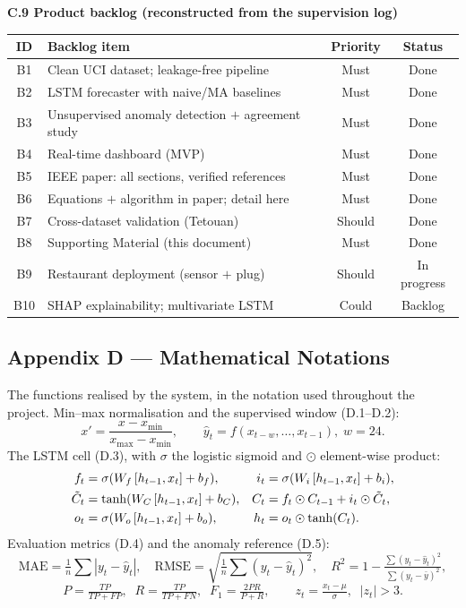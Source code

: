 \documentclass[11pt,a4paper]{article}
\begin{document}
\noindent\textbf{C.9 Product backlog (reconstructed from the supervision log)}\par\smallskip
\begin{tabular}{|c|p{7.4cm}|c|c|}
\hline
\textbf{ID} & \textbf{Backlog item} & \textbf{Priority} & \textbf{Status}\\ \hline
B1 & Clean UCI dataset; leakage-free pipeline & Must & Done\\ \hline
B2 & LSTM forecaster with naive/MA baselines & Must & Done\\ \hline
B3 & Unsupervised anomaly detection $+$ agreement study & Must & Done\\ \hline
B4 & Real-time dashboard (MVP) & Must & Done\\ \hline
B5 & IEEE paper: all sections, verified references & Must & Done\\ \hline
B6 & Equations $+$ algorithm in paper; detail here & Must & Done\\ \hline
B7 & Cross-dataset validation (Tetouan) & Should & Done\\ \hline
B8 & Supporting Material (this document) & Must & Done\\ \hline
B9 & Restaurant deployment (sensor $+$ plug) & Should & In progress\\ \hline
B10 & SHAP explainability; multivariate LSTM & Could & Backlog\\ \hline
\end{tabular}

\clearpage
\subsection{Appendix D --- Mathematical Notations}
The functions realised by the system, in the notation used throughout the
project. Min--max normalisation and the supervised window (D.1--D.2):
\begin{equation}
x' = \frac{x - x_{\min}}{x_{\max} - x_{\min}}, \qquad
\hat{y}_{t} = f\!\left(x_{t-w},\dots,x_{t-1}\right),\; w = 24 .
\end{equation}
The LSTM cell (D.3), with $\sigma$ the logistic sigmoid and $\odot$
element-wise product:
\begin{align}
f_t &= \sigma(W_f\,[h_{t-1},x_t]+b_f), &
i_t &= \sigma(W_i\,[h_{t-1},x_t]+b_i), \notag\\
\tilde{C}_t &= \tanh(W_C\,[h_{t-1},x_t]+b_C), &
C_t &= f_t \odot C_{t-1} + i_t \odot \tilde{C}_t, \notag\\
o_t &= \sigma(W_o\,[h_{t-1},x_t]+b_o), &
h_t &= o_t \odot \tanh(C_t).
\end{align}
Evaluation metrics (D.4) and the anomaly reference (D.5):
\begin{equation}
\mathrm{MAE}=\tfrac{1}{n}\!\sum|y_t-\hat{y}_t|,\quad
\mathrm{RMSE}=\sqrt{\tfrac{1}{n}\!\sum(y_t-\hat{y}_t)^2},\quad
R^2 = 1-\tfrac{\sum(y_t-\hat{y}_t)^2}{\sum(y_t-\bar{y})^2},
\end{equation}
\begin{equation}
P=\tfrac{TP}{TP+FP},\;\; R=\tfrac{TP}{TP+FN},\;\; F_1=\tfrac{2PR}{P+R},
\qquad z_t=\tfrac{x_t-\mu}{\sigma},\;\; |z_t|>3 .
\end{equation}
\end{document}
